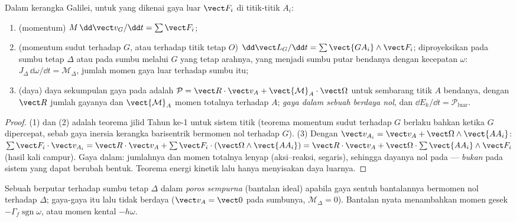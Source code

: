 \begin{theorem}\label{thm:b2:rigid-body-mechanics:laws}
Dalam kerangka Galilei, untuk  yang dikenai gaya luar
$\vect F_i$ di titik-titik $A_i$:
\begin{enumerate}
  \item (momentum) $M\,\dd\vect v_G/\dd t = \sum\vect F_i$;
  \item (momentum sudut terhadap $G$, atau terhadap titik tetap $O$)
        $\dd\vect L_G/\dd t = \sum\vect{GA_i}\wedge\vect F_i$;
        diproyeksikan pada sumbu tetap $\Delta$ atau pada sumbu melalui
        $G$ yang tetap arahnya, yang menjadi sumbu putar bendanya
        dengan kecepatan $\omega$:
        $J_\Delta\,\dd\omega/\dd t = \mathcal M_\Delta$, jumlah momen
        gaya luar terhadap sumbu itu;
  \item (daya) daya sekumpulan gaya pada  adalah
        $\mathcal P = \vect R\cdot\vect v_A + \vect{\mathcal M}_A\cdot
        \vect\Omega$ untuk sembarang titik $A$ bendanya, dengan $\vect R$
        jumlah gayanya dan $\vect{\mathcal M}_A$ momen totalnya terhadap
        $A$; \emph{gaya dalam sebuah  berdaya nol}, dan
        $\dd E_k/\dd t = \mathcal P_{\text{luar}}$.
\end{enumerate}
\end{theorem}

\begin{proof}
(1) dan (2) adalah teorema jilid Tahun ke-1 untuk sistem titik (teorema
momentum sudut terhadap $G$ berlaku bahkan ketika $G$ dipercepat, sebab
gaya inersia kerangka barisentrik bermomen nol terhadap $G$). (3) Dengan
$\vect v_{A_i} = \vect v_A + \vect\Omega
\wedge\vect{AA_i}$: $\sum\vect F_i\cdot\vect v_{A_i} = \vect R\cdot\vect v_A
+ \sum\vect F_i\cdot(\vect\Omega\wedge\vect{AA_i}) = \vect R\cdot\vect v_A +
\vect\Omega\cdot\sum\vect{AA_i}\wedge\vect F_i$ (hasil kali campur). Gaya
dalam: jumlahnya dan momen totalnya lenyap (aksi--reaksi, segaris),
sehingga dayanya nol pada  --- \emph{bukan} pada sistem yang
dapat berubah bentuk. Teorema energi kinetik lalu hanya menyisakan daya
luarnya.
\end{proof}

\begin{definition}\label{def:b2:rigid-body-mechanics:pivot}
Sebuah  berputar terhadap sumbu tetap $\Delta$ dalam
\emph{poros sempurna} (bantalan ideal) apabila gaya sentuh bantalannya
bermomen nol terhadap $\Delta$; gaya-gaya itu lalu tidak berdaya
($\vect v_A = \vect 0$ pada sumbunya, $\mathcal M_\Delta = 0$). Bantalan
nyata menambahkan momen gesek $-\Gamma_f\operatorname{sgn}\omega$, atau
momen kental $-h\omega$.
\end{definition}

